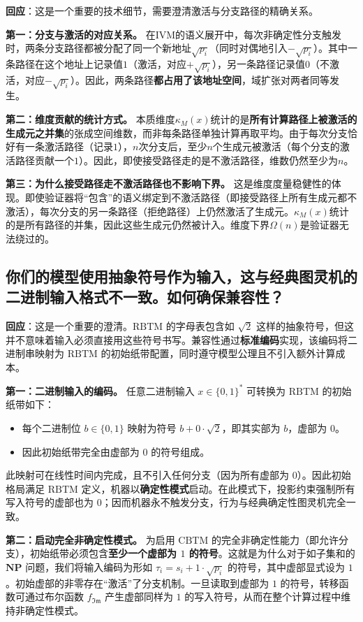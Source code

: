 \documentclass{ctexart}
\begin{document}
	\textbf{回应}：这是一个重要的技术细节，需要澄清激活与分支路径的精确关系。
	
	\textbf{第一：分支与激活的对应关系。} 在IVM的语义展开中，每次非确定性分支触发时，两条分支路径都被分配了同一个新地址$\sqrt{p_i}$（同时对偶地引入$-\sqrt{p_i}$）。其中一条路径在这个地址上记录值$1$（激活，对应$+\sqrt{p_i}$），另一条路径记录值$0$（不激活，对应$-\sqrt{p_i}$）。因此，两条路径\textbf{都占用了该地址空间}，域扩张对两者同等发生。
	
	\textbf{第二：维度贡献的统计方式。} 本质维度$\kappa_M(x)$统计的是\textbf{所有计算路径上被激活的生成元之并集}的张成空间维数，而非每条路径单独计算再取平均。由于每次分支恰好有一条激活路径（记录$1$），$n$次分支后，至少$n$个生成元被激活（每个分支的激活路径贡献一个$1$）。因此，即使接受路径走的是不激活路径，维数仍然至少为$n$。
	
	\textbf{第三：为什么接受路径走不激活路径也不影响下界。} 这是维度度量稳健性的体现。即使验证器将``包含''的语义绑定到不激活路径（即接受路径上所有生成元都不激活），每次分支的另一条路径（拒绝路径）上仍然激活了生成元。$\kappa_M(x)$统计的是所有路径的并集，因此这些生成元仍然被计入。维度下界$\Omega(n)$是验证器无法绕过的。
	
		
	\subsection{你们的模型使用抽象符号作为输入，这与经典图灵机的二进制输入格式不一致。如何确保兼容性？}
	
	\textbf{回应}：这是一个重要的澄清。$\text{RBTM}$ 的字母表包含如 $\sqrt{2}$ 这样的抽象符号，但这并不意味着输入必须直接用这些符号书写。兼容性通过\textbf{标准编码}实现，该编码将二进制串映射为 $\text{RBTM}$ 的初始纸带配置，同时遵守模型公理且不引入额外计算成本。
	
	\noindent\textbf{第一：二进制输入的编码。} 任意二进制输入 $x \in \{0,1\}^*$ 可转换为 $\text{RBTM}$ 的初始纸带如下：
	\begin{itemize}
		\item 每个二进制位 $b \in \{0,1\}$ 映射为符号 $b + 0 \cdot \sqrt{2}$，即其实部为 $b$，虚部为 $0$。
		\item 因此初始纸带完全由虚部为 $0$ 的符号组成。
	\end{itemize}
	此映射可在线性时间内完成，且不引入任何分支（因为所有虚部为 $0$）。因此初始格局满足 $\text{RBTM}$ 定义，机器以\textbf{确定性模式}启动。在此模式下，投影约束强制所有写入符号的虚部也为 $0$；因而机器永不触发分支，行为与经典确定性图灵机完全一致。
	
	\noindent\textbf{第二：启动完全非确定性模式。} 为启用 $\text{CBTM}$ 的完全非确定性能力（即允许分支），初始纸带必须包含\textbf{至少一个虚部为 $1$ 的符号}。这就是为什么对于如子集和的 $\mathbf{NP}$ 问题，我们将输入编码为形如 $\tau_i = s_i + 1 \cdot \sqrt{p_i}$ 的符号，其中虚部显式设为 $1$。初始虚部的非零存在``激活''了分支机制。一旦读取到虚部为 $1$ 的符号，转移函数可通过布尔函数 $f_{\mathfrak{Im}}$ 产生虚部同样为 $1$ 的写入符号，从而在整个计算过程中维持非确定性模式。
	
\end{document}
